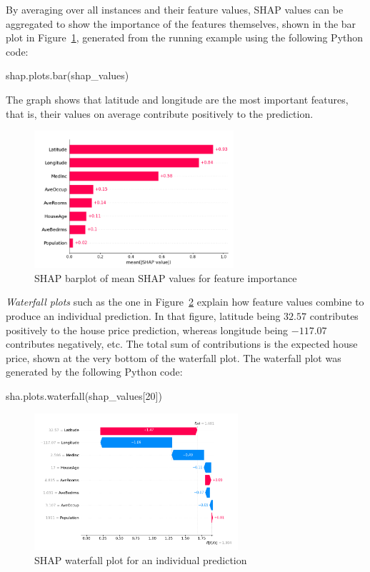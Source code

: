 By averaging over all instances and their feature values, SHAP values can be aggregated to show the importance of the features themselves, shown in the bar plot in Figure~\ref{fig:shapbar2}, generated from the running example using the following Python code:

\begin{pythoncode}
shap.plots.bar(shap_values)
\end{pythoncode}

The graph shows that latitude and longitude are the most important features, that is, their values on average contribute positively to the prediction. 

\begin{figure}
\centering

\includegraphics[height=2in]{shap_barplot2.png}
\caption{SHAP barplot of mean SHAP values for feature importance}
\label{fig:shapbar2}
\end{figure}

\emph{Waterfall plots} such as the one in Figure~\ref{fig:shapwaterfall} explain how feature values combine to produce an individual prediction. In that figure, latitude being $32.57$ contributes positively to the house price prediction, whereas longitude being $-117.07$ contributes negatively, etc. The total sum of contributions is the expected house price, shown at the very bottom of the waterfall plot. The waterfall plot was generated by the following Python code:
 
\begin{pythoncode}
sha.plots.waterfall(shap_values[20])
\end{pythoncode}

\begin{figure}
\centering

\includegraphics[height=2in]{shap_waterfall1.png}
\caption{SHAP waterfall plot for an individual prediction}
\label{fig:shapwaterfall}
\end{figure}



